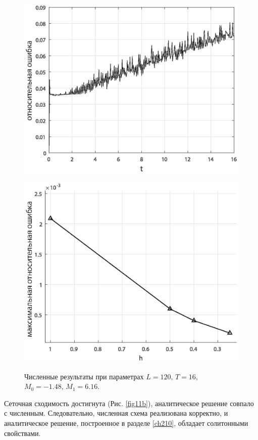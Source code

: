 \documentclass[12pt,a4paper]{article}
\begin{document}
	\begin{figure}[H]
		\begin{center}
			\begin{minipage}[h]{0.48\linewidth} %
				\includegraphics[width=1\linewidth]{Medvedev_fig7.eps}
				\label{fig11a}
			\end{minipage}
			\hfill
			\begin{minipage}[h]{0.48\linewidth}
				\includegraphics[width=1\linewidth]{Medvedev_fig15.eps}
				\label{fig11b}
			\end{minipage}
		\end{center}
		\caption{Численные результаты при параметрах
		\(L=120,\, T=16\), 
		\(M_{0}=-1.48,\, M_{1}=6.16\).}
		\label{fig11}
	\end{figure}
	Сеточная сходимость достигнута (Рис. \ref{fig11b}), аналитическое решение совпало с численным. Следовательно, численная схема реализована корректно, и аналитическое решение, построенное в разделе \ref{ch210}, обладает солитонными свойствами.
\end{document}
